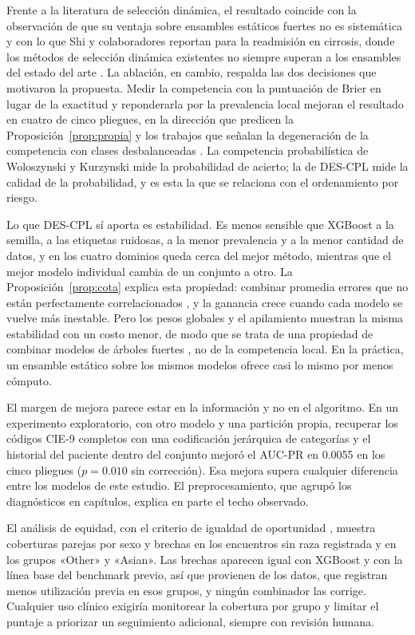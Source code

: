\documentclass[pdflatex,sn-mathphys-num]{sn-jnl}
\theoremstyle{plain}
\begin{document}
Frente a la literatura de selección dinámica, el resultado coincide con la observación de que su ventaja sobre ensambles estáticos fuertes no es sistemática \cite{bib_cruz_2018} y con lo que Shi y colaboradores reportan para la readmisión en cirrosis, donde los métodos de selección dinámica existentes no siempre superan a los ensambles del estado del arte \cite{bib_shi_2025}. La ablación, en cambio, respalda las dos decisiones que motivaron la propuesta. Medir la competencia con la puntuación de Brier en lugar de la exactitud y reponderarla por la prevalencia local mejoran el resultado en cuatro de cinco pliegues, en la dirección que predicen la Proposición~\ref{prop:propia} y los trabajos que señalan la degeneración de la competencia con clases desbalanceadas \cite{bib_garcia_2018, bib_cruz_2019}. La competencia probabilística de Woloszynski y Kurzynski \cite{bib_woloszynski_2011} mide la probabilidad de acierto; la de DES-CPL mide la calidad de la probabilidad, y es esta la que se relaciona con el ordenamiento por riesgo.

Lo que DES-CPL sí aporta es estabilidad. Es menos sensible que XGBoost a la semilla, a las etiquetas ruidosas, a la menor prevalencia y a la menor cantidad de datos, y en los cuatro dominios queda cerca del mejor método, mientras que el mejor modelo individual cambia de un conjunto a otro. La Proposición~\ref{prop:cota} explica esta propiedad: combinar promedia errores que no están perfectamente correlacionados \cite{bib_krogh_1995}, y la ganancia crece cuando cada modelo se vuelve más inestable. Pero los pesos globales y el apilamiento muestran la misma estabilidad con un costo menor, de modo que se trata de una propiedad de combinar modelos de árboles fuertes \cite{bib_grinsztajn_2022}, no de la competencia local. En la práctica, un ensamble estático sobre los mismos modelos ofrece casi lo mismo por menos cómputo.

El margen de mejora parece estar en la información y no en el algoritmo. En un experimento exploratorio, con otro modelo y una partición propia, recuperar los códigos CIE-9 completos con una codificación jerárquica de categorías \cite{bib_micci_barreca_2001} y el historial del paciente dentro del conjunto mejoró el AUC-PR en 0.0055 en los cinco pliegues ($p=0.010$ sin corrección). Esa mejora supera cualquier diferencia entre los modelos de este estudio. El preprocesamiento, que agrupó los diagnósticos en capítulos, explica en parte el techo observado.

El análisis de equidad, con el criterio de igualdad de oportunidad \cite{bib_hardt_2016}, muestra coberturas parejas por sexo y brechas en los encuentros sin raza registrada y en los grupos «Other» y «Asian». Las brechas aparecen igual con XGBoost y con la línea base del benchmark previo, así que provienen de los datos, que registran menos utilización previa en esos grupos, y ningún combinador las corrige. Cualquier uso clínico exigiría monitorear la cobertura por grupo y limitar el puntaje a priorizar un seguimiento adicional, siempre con revisión humana.
\end{document}
